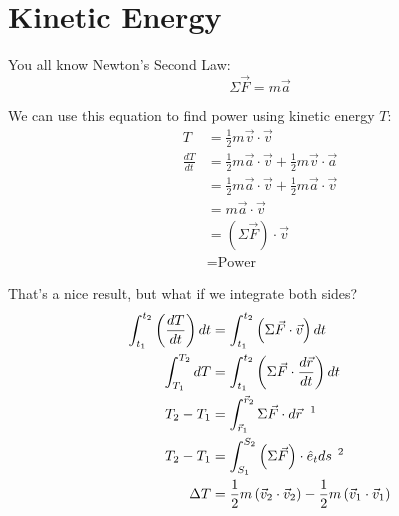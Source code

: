 \documentclass{article}
\begin{document}
\clearpage


\section*{Kinetic Energy}

You all know Newton's Second Law: \\
\begin{equation*}
    \Sigma \vec{F} = m \vec{a}
\end{equation*}

We can use this equation to find power using kinetic energy $T$:
\begin{align*}
    T &= \frac{1}{2}m\vec{v} \cdot \vec{v} \\
    \frac{dT}{dt}         &= \frac{1}{2}m\vec{a} \cdot \vec{v} + \frac{1}{2}m\vec{v} \cdot \vec{a} \\
                          &= \frac{1}{2}m\vec{a} \cdot \vec{v} + \frac{1}{2}m\vec{a} \cdot \vec{v} \\
                          &= m \vec{a} \cdot \vec{v} \\
                          &= \left( \Sigma \vec{F} \right) \cdot \vec{v} \\
                          &= \text{Power}
\end{align*}

That's a nice result, but what if we integrate both sides?
\begin{align*}
    \int_{t_1}^{t_2} \left(\frac{dT}{dt} \right) dt &= \int_{t_1}^{t_2} \left( \Sigma \vec{F} \cdot \vec{v} \right) dt \\
    \int_{T_1}^{T_2} dT                             &= \int_{t_1}^{t_2} \left( \Sigma \vec{F} \cdot \frac{d\vec{r}}{dt} \right) dt \\
    T_2 - T_1                                       &= \int_{\vec{r}_1}^{\vec{r}_2} \Sigma \vec{F} \cdot d\vec{r}   \hspace{0.2cm} \text{\footnotemark} \\
    T_2 - T_1                                       &= \int_{S_1}^{S_2} \left( \Sigma \vec{F} \right) \cdot \hat{e}_t ds \hspace{0.15cm} \text{\footnotemark} \\
    \Delta T                                        &= \frac{1}{2} m \left( \vec{v}_2 \cdot \vec{v}_2 \right) - \frac{1}{2} m \left( \vec{v}_1 \cdot \vec{v}_1 \right)
\end{align*}
\end{document}

